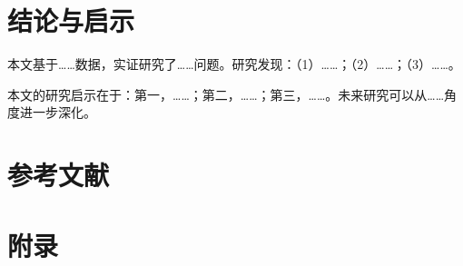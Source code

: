 \documentclass[10.5pt, UTF8, twocolumn, landscape]{ctexart}
\begin{document}
\section{结论与启示}
\label{sec:concl}

本文基于……数据，实证研究了……问题。研究发现：（1）……；（2）……；（3）……。

本文的研究启示在于：第一，……；第二，……；第三，……。未来研究可以从……角度进一步深化。

\section*{参考文献}


\clearpage
\appendix
\section*{附录}
\end{document}
